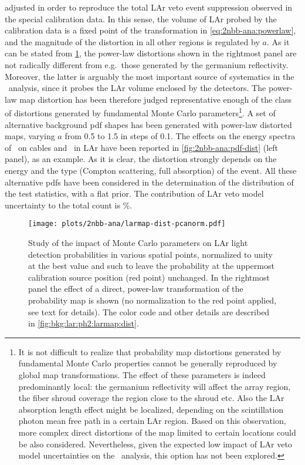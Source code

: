 \begin{description}[wide]
    adjusted in order to reproduce the total LAr veto event suppression observed in the
    special calibration data. In this sense, the volume of LAr probed by the calibration
    data is a fixed point of the transformation in \cref{eq:2nbb-ana:powerlaw}, and the
    magnitude of the distortion in all other regions is regulated by $a$.
    \newpar
    As it can be stated from \cref{fig:2nbb-ana:dist-pcanorm}, the power-law distortions
    shown in the rightmost panel are not radically different from e.g.~those generated by
    the germanium reflectivity. Moreover, the latter is arguably the most important source
    of systematics in the \nnbb\ analysis, since it probes the LAr volume enclosed by the
    detectors. The power-law map distortion has been therefore judged representative
    enough of the class of distortions generated by fundamental Monte Carlo
    parameters\footnote{%
      It is not difficult to realize that probability map distortions generated by
      fundamental Monte Carlo properties cannot be generally reproduced by global map
      transformations. The effect of these parameters is indeed predominantly local: the
      germanium reflectivity will affect the array region, the fiber shroud coverage the
      region close to the shroud etc. Also the LAr absorption length effect might be
      localized, depending on the scintillation photon mean free path in a certain LAr
      region.  Based on this observation, more complex direct distortions of the map
      limited to certain locations could be also considered. Nevertheless, given the
      expected low impact of LAr veto model uncertainties on the \nnbb\ analysis, this
      option has not been explored.
    }.
    \newpar
    A set of alternative background pdf shapes has been generated with power-law distorted
    maps, varying $a$ from 0.5 to 1.5 in steps of 0.1. The effects on the energy
    spectra of \kvn\ on cables and \kvz\ in LAr have been reported in
    \cref{fig:2nbb-ana:pdf-dist} (left panel), as an example. As it is clear, the
    distortion strongly depends on the energy and the type (Compton scattering, full
    absorption) of the event. All these alternative pdfs have been considered in the
    determination of the distribution of the test statistics, with a flat prior. The
    contribution of LAr veto model uncertainty to the total count is \%.

    \begin{figure}
      \centering
      \texttt{[image: plots/2nbb-ana/larmap-dist-pcanorm.pdf]}
      \caption{%
        Study of the impact of Monte Carlo parameters on LAr light detection probabilities in
        various spatial points, normalized to unity at the best value and such to leave the
        probability at the uppermost calibration source position (red point) unchanged. In
        the rightmost panel the effect of a direct, power-law transformation of the
        probability map is shown (no normalization to the red point applied, see text for
        details). The color code and other details are described in
        \cref{fig:bkg:lar:ph2:larmap:dist}.
      }\label{fig:2nbb-ana:dist-pcanorm}
    \end{figure}


\end{description}

